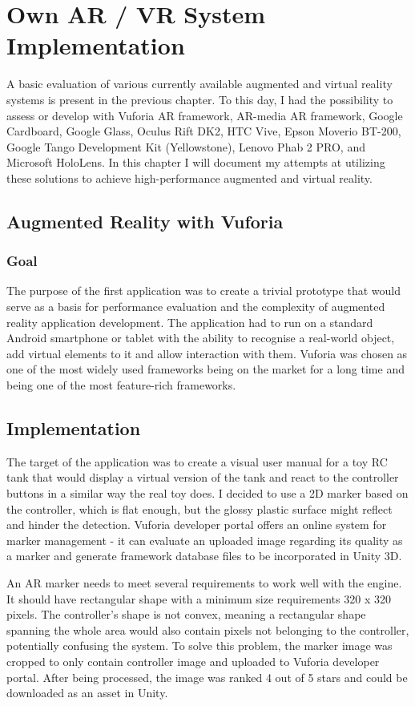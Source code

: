 \documentclass[12pt, a4paper]{article}
\begin{document}
\section{Own AR / VR System Implementation}
A basic evaluation of various currently available augmented and virtual reality systems is present in the previous chapter. To this day, I had the possibility to assess or develop with Vuforia AR framework, AR-media AR framework, Google Cardboard, Google Glass, Oculus Rift DK2, HTC Vive, Epson Moverio BT-200, Google Tango Development Kit (Yellowstone), Lenovo Phab 2 PRO, and Microsoft HoloLens. In this chapter I will document my attempts at utilizing these solutions to achieve high-performance augmented and virtual reality.

\subsection{Augmented Reality with Vuforia}
\subsubsection{Goal}
The purpose of the first application was to create a trivial prototype that would serve as a basis for performance evaluation and the complexity of augmented reality application development. The application had to run on a standard Android smartphone or tablet with the ability to recognise a real-world object, add virtual elements to it and allow interaction with them. Vuforia was chosen as one of the most widely used frameworks being on the market for a long time and being one of the most feature-rich frameworks.

\subsection{Implementation}
The target of the application was to create a visual user manual for a toy RC tank that would display a virtual version of the tank and react to the controller buttons in a similar way the real toy does. I decided to use a 2D marker based on the controller, which is flat enough, but the glossy plastic surface might reflect and hinder the detection. Vuforia developer portal offers an online system for marker management - it can evaluate an uploaded image regarding its quality as a marker and generate framework database files to be incorporated in Unity 3D.

An AR marker needs to meet several requirements to work well with the engine. It should have rectangular shape with a minimum size requirements 320 x 320 pixels. The controller’s shape is not convex, meaning a rectangular shape spanning the whole area would also contain pixels not belonging to the controller, potentially confusing the system. To solve this problem, the marker image was cropped to only contain controller image and uploaded to Vuforia developer portal. After being processed, the image was ranked 4 out of 5 stars and could be downloaded as an asset in Unity.
\end{document}
